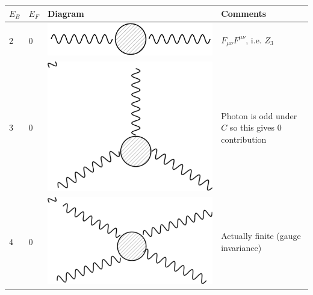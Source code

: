 \begin{table}[h!]
\begin{tabular}{llll}
$E_B$ & $E_F$ & Diagram                                                 & Comments                                                                                              \\
\hline
2     & 0     & \includegraphics[scale=0.2]{figs/pc1.pdf} & $F_{\mu\nu}F^{\mu\nu}$, i.e. $Z_3$                                                                         \\
3     & 0     & \includegraphics[scale=0.2]{figs/pc2.pdf}  & Photon is odd under $C$ so this gives 0 contribution                                                    \\ 
4     & 0     &  \includegraphics[scale=0.2]{figs/pc3.pdf}    & Actually finite (gauge invariance)                                                                    \\ 

\end{tabular}
\end{table}

